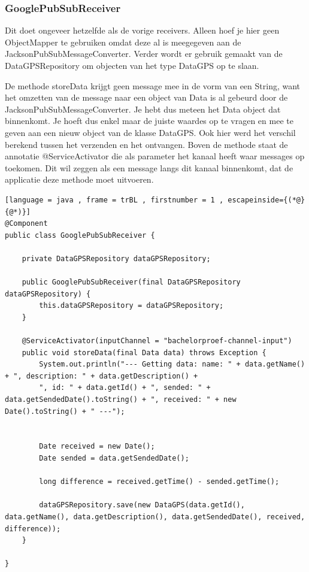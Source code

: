 \subsubsection{GooglePubSubReceiver}
Dit doet ongeveer hetzelfde als de vorige receivers. Alleen hoef je hier geen ObjectMapper te gebruiken omdat deze al is meegegeven aan de JacksonPubSubMessageConverter. Verder wordt er gebruik gemaakt van de DataGPSRepository om objecten van het type DataGPS op te slaan. 

De methode storeData krijgt geen message mee in de vorm van een String, want het omzetten van de message naar een object van Data is al gebeurd door de JacksonPubSubMessageConverter. Je hebt dus meteen het Data object dat binnenkomt. Je hoeft dus enkel maar de juiste waardes op te vragen en mee te geven aan een nieuw object van de klasse DataGPS. Ook hier werd het verschil berekend tussen het verzenden en het ontvangen. Boven de methode staat de annotatie @ServiceActivator die als parameter het kanaal heeft waar messages op toekomen. Dit wil zeggen als een message langs dit kanaal binnenkomt, dat de applicatie deze methode moet uitvoeren.
\begin{lstlisting}[language = java , frame = trBL , firstnumber = 1 , escapeinside={(*@}{@*)}]
@Component
public class GooglePubSubReceiver {

    private DataGPSRepository dataGPSRepository;

    public GooglePubSubReceiver(final DataGPSRepository dataGPSRepository) {
        this.dataGPSRepository = dataGPSRepository;
    }

    @ServiceActivator(inputChannel = "bachelorproef-channel-input")
    public void storeData(final Data data) throws Exception {
        System.out.println("--- Getting data: name: " + data.getName() + ", description: " + data.getDescription() +
        ", id: " + data.getId() + ", sended: " + data.getSendedDate().toString() + ", received: " + new Date().toString() + " ---");


        Date received = new Date();
        Date sended = data.getSendedDate();

        long difference = received.getTime() - sended.getTime();

        dataGPSRepository.save(new DataGPS(data.getId(), data.getName(), data.getDescription(), data.getSendedDate(), received, difference));
    }

}
\end{lstlisting}


